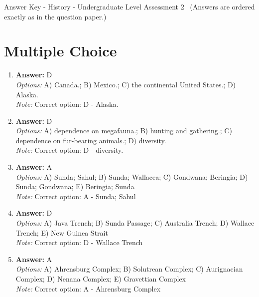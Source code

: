 \documentclass[12pt]{article}
\begin{document}
\begin{center}
Answer Key - History - Undergraduate Level Assessment 2 \
\small (Answers are ordered exactly as in the question paper.)
\end{center}

\section*{Multiple Choice}
\begin{enumerate}[label=\arabic*.]
\item \textbf{Answer:} D
\\ \textit{Options:} A) Canada.; B) Mexico.; C) the continental United States.; D) Alaska.
\\ \textit{Note:} Correct option: D - Alaska.
\item \textbf{Answer:} D
\\ \textit{Options:} A) dependence on megafauna.; B) hunting and gathering.; C) dependence on fur-bearing animals.; D) diversity.
\\ \textit{Note:} Correct option: D - diversity.
\item \textbf{Answer:} A
\\ \textit{Options:} A) Sunda; Sahul; B) Sunda; Wallacea; C) Gondwana; Beringia; D) Sunda; Gondwana; E) Beringia; Sunda
\\ \textit{Note:} Correct option: A - Sunda; Sahul
\item \textbf{Answer:} D
\\ \textit{Options:} A) Java Trench; B) Sunda Passage; C) Australia Trench; D) Wallace Trench; E) New Guinea Strait
\\ \textit{Note:} Correct option: D - Wallace Trench
\item \textbf{Answer:} A
\\ \textit{Options:} A) Ahrensburg Complex; B) Solutrean Complex; C) Aurignacian Complex; D) Nenana Complex; E) Gravettian Complex
\\ \textit{Note:} Correct option: A - Ahrensburg Complex
\end{enumerate}
\end{document}
